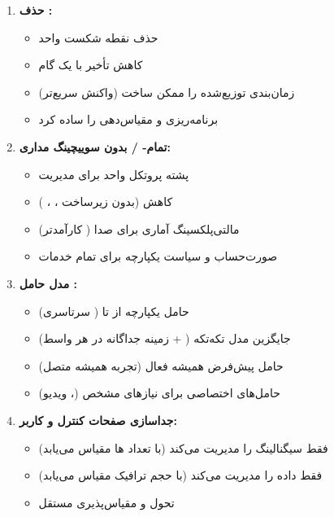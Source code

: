 \begin{enumerate}
\def\labelenumi{\arabic{enumi}.}
\tightlist
\item
  \textbf{حذف :}

  \begin{itemize}
  \tightlist
  \item
    حذف نقطه شکست واحد
  \item
    کاهش تأخیر با یک گام
  \item
    زمان‌بندی توزیع‌شده را ممکن ساخت (واکنش سریع‌تر)
  \item
    برنامه‌ریزی و مقیاس‌دهی  را ساده کرد
  \end{itemize}
\item
  \textbf{تمام- /\allowbreak{} بدون سوییچینگ مداری:}

  \begin{itemize}
  \tightlist
  \item
    پشته پروتکل واحد برای مدیریت
  \item
    کاهش  (بدون زیرساخت ، ، )
  \item
    مالتی‌پلکسینگ آماری برای صدا ( کارآمدتر)
  \item
    صورت‌حساب و سیاست یکپارچه برای تمام خدمات
  \end{itemize}
\item
  \textbf{مدل حامل :}

  \begin{itemize}
  \tightlist
  \item
    حامل یکپارچه از  تا  ( سرتاسری)
  \item
    جایگزین مدل تکه‌تکه  ( + زمینه  جداگانه در هر واسط)
  \item
    حامل پیش‌فرض همیشه فعال (تجربه همیشه متصل)
  \item
    حامل‌های اختصاصی برای نیازهای  مشخص (، ویدیو)
  \end{itemize}
\item
  \textbf{جداسازی صفحات کنترل و کاربر:}

  \begin{itemize}
  \tightlist
  \item
     فقط سیگنالینگ را مدیریت می‌کند (با تعداد ها مقیاس می‌یابد)
  \item
     فقط داده را مدیریت می‌کند (با حجم ترافیک مقیاس می‌یابد)
  \item
    تحول و مقیاس‌پذیری مستقل
  \end{itemize}
\end{enumerate}

